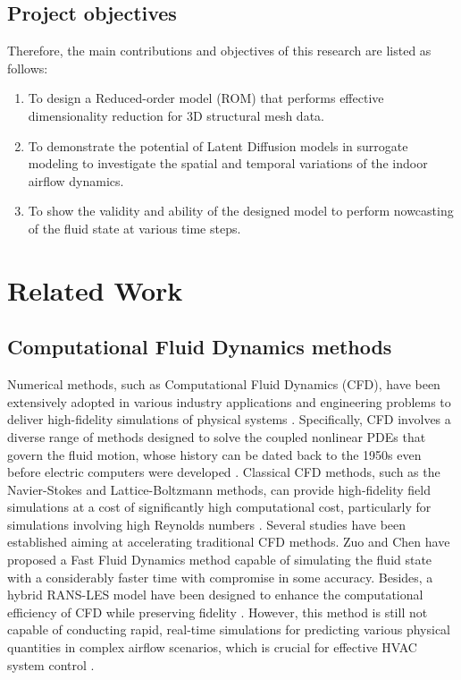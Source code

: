 \documentclass[final-report]{article-template}
\begin{document}
\subsection{Project objectives}
Therefore, the main contributions and objectives of this research are listed as follows:
\begin{enumerate}
    \item To design a Reduced-order model (ROM) that performs effective dimensionality reduction for 3D structural mesh data.  
    \item To demonstrate the potential of Latent Diffusion models in surrogate modeling to investigate the spatial and temporal variations of the indoor airflow dynamics.
    \item To show the validity and ability of the designed model to perform nowcasting of the fluid state at various time steps.
\end{enumerate}

\section{Related Work}

\subsection{Computational Fluid Dynamics methods}
Numerical methods, such as Computational Fluid Dynamics (CFD), have been extensively adopted in various industry applications and engineering problems to deliver high-fidelity simulations of physical systems \cite{Lassila2014}. Specifically, CFD involves a diverse range of methods designed to solve the coupled nonlinear PDEs that govern the fluid motion, whose history can be dated back to the 1950s even before electric computers were developed \cite{Bhattacharyya21}. Classical CFD methods, such as the Navier-Stokes and Lattice-Boltzmann methods, can provide high-fidelity field simulations at a cost of significantly high computational cost, particularly for simulations involving high Reynolds numbers \cite{shu2023physics}. Several studies have been established aiming at accelerating traditional CFD methods. Zuo and Chen \cite{zuo2010fast} have proposed a Fast Fluid Dynamics method capable of simulating the fluid state with a considerably faster time with compromise in some accuracy. Besides, a hybrid RANS-LES model have been designed to enhance the computational efficiency of CFD while preserving fidelity \cite{walters2013investigation}. However, this method is still not capable of conducting rapid, real-time simulations for predicting various physical quantities in complex airflow scenarios, which is crucial for effective HVAC system control \cite{shu2023physics}.
\end{document}
